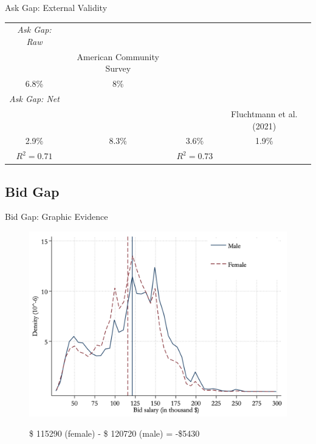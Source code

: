 \begin{frame}{Ask Gap: External Validity}
    \begin{table}[h!]
        \scriptsize
        \begin{center}
            \begin{tabular}{cccc}
                \hline
                \textcolor{frenchlilac!45!white}{\textit{Ask Gap: Raw}} \\
                { \citet{roussille2021central}} & {\tiny American Community Survey }& \\
                6.8\% & 8\% \\ \hline
                \textcolor{frenchlilac!45!white}{\textit{Ask Gap: Net}} \\
                { \citet{roussille2021central}} & {\tiny \citet{krueger2016contribut}} &{\tiny \citet{le2021gender}} & {\tiny Fluchtmann et al. (2021)}\\
                2.9\% & 8.3\% & 3.6\% & 1.9\% \\
                $R^2 = 0.71$ & & $R^2 = 0.73$ & \\
                \hline
            \end{tabular}
        \end{center}
    \end{table}
\end{frame}

\subsection*{Bid Gap}
\begin{frame}{Bid Gap: Graphic Evidence}
    \begin{figure}
        \centering
        \includegraphics[height = 0.7 \textheight]{images/bidgap.png}
        
        {\footnotesize \textcolor{frenchlilac!45!white}{\$ 115290} (female) - \textcolor{frenchlilac!45!white}{\$ 120720} (male) = \textcolor{frenchlilac!45!white}{-\$5430}}
    \end{figure}
\end{frame}

